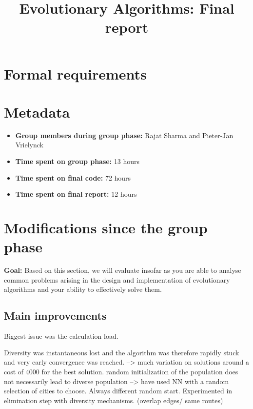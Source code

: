 \documentclass[a4paper,10pt]{article}
\title{Evolutionary Algorithms: Final report}
\author{\ReplaceMe{Stijn Staring (r0620003)}}
\newcommand{\ReplaceMe}[1]{{\color{blue}#1}}
\newcommand{\RemoveMe}[1]{{\color{purple}#1}}
\begin{document}
\selectfont{}

\maketitle

\section{\RemoveMe{Formal requirements}} \label{sec_this}

\section{Metadata}

\begin{itemize}
 \item \textbf{Group members during group phase:} Rajat Sharma and
 Pieter-Jan Vrielynck \\
 \item \textbf{Time spent on group phase:} \ReplaceMe{13 hours}
 \item \textbf{Time spent on final code:} \ReplaceMe{72 hours}
 \item \textbf{Time spent on final report:} \ReplaceMe{12 hours}\\
\end{itemize}

\section{Modifications since the group phase}

\RemoveMe{\textbf{Goal:} Based on this section, we will evaluate insofar as you are able to analyse common problems arising in the design and implementation of evolutionary algorithms and your ability to effectively solve them.}

\subsection{Main improvements}


Biggest issue was the calculation load. 

Diversity was instantaneous lost and the algorithm was therefore rapidly stuck and very early convergence was reached. --> much variation on solutions around a cost of 4000 for the best solution.
random initialization of the population does not necessarily lead to diverse population --> have used NN with a random selection of cities to choose. Always different random start. Experimented in elimination step with diversity mechanisms. (overlap edges/ same routes)
\end{document}
